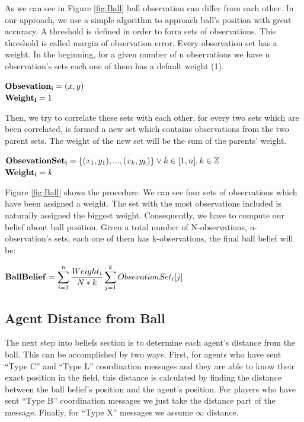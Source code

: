 As we can see in Figure \ref{fig:Ball} ball observation can differ from each other. In our approach, we use a simple algorithm to approach ball's position with great accuracy. A threshold is defined in order to form sets of observations. This threshold is called margin of observation error. Every observation set has a weight. In the beginning, for a given number of n observations we have n observation's sets each one of them has a default weight (1).\\
\begin{center}
${\bf Obsevation_{i} } = (x,y)$\\
${\bf Weight_{i}} = 1$\\
\end{center}
Then, we try to correlate these sets with each other, for every two sets which are been correlated, is formed a new set which contains observations from the two parent sets. The weight of the new set will be the sum of the parents' weight.\\
\begin{center}
${\bf Obsevation Set_{i} } = \lbrace (x_{1},y_{1}),...,(x_{k},y_{k}) \rbrace \vee k \in [1,n] , k\in \mathbb{Z}$\\
${\bf Weight_{i}} = k$\\
\end{center}
Figure \ref{fig:Ball} shows the procedure. We can see four sets of observations which have been assigned a weight. The set with the most observations included is naturally assigned the biggest weight. Consequently, we have to compute our belief about ball position.
Given a total number of N-observations, n-observation's sets, each one of them has k-observations, the final ball belief will be:\\
\begin{center}
${\bf Ball Belief} = \displaystyle\sum\limits_{i=1}^n \frac {Weight_{i}} {N \ast k}  \displaystyle\sum\limits_{j=1}^k Obsevation Set_{i}[j]$
\end{center}



\subsection{Agent Distance from Ball}
The next step into beliefs section is to determine each agent's distance from the ball. This can be accomplished by two ways. First, for agents who have sent ``Type C'' and ``Type L'' coordination messages and they are able to know their exact position in the field, this distance is calculated by finding the distance between the ball belief's position and the agent's position. For players who have sent ``Type B'' coordination messages we just take the distance part of the message. Finally, for ``Type X'' messages we assume $\infty$ distance.


